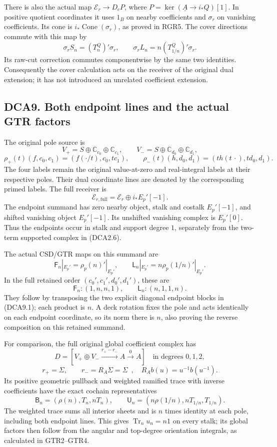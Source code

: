 There is also the actual map \(\mathscr E_r\to D_cP\), where
\(P=\ker(\underline A\to i_*Q)[1]\). In positive quotient coordinates it
uses \(1_B\) on nearby coefficients and \(\sigma_r\) on vanishing
coefficients. Its cone is \(i_*\operatorname{Cone}(\sigma_r)\), as
proved in RGR5. The cover directions commute with this map by \[
\sigma_rS_n=(T_n^Q)'\sigma_r,\qquad
\sigma_rL_n=n(T_{1/n}^Q)'\sigma_r.
\tag{DCA8.4}
\] Its raw-cut correction commutes componentwise by the same two
identities. Consequently the cover calculation acts on the receiver of
the original dual extension; it has not introduced an unrelated
coefficient extension.

\subsection{DCA9. Both endpoint lines and the actual GTR
factors}\label{dca9.-both-endpoint-lines-and-the-actual-gtr-factors}

The original pole source is \[
V_+=S\oplus\mathbb C_{c_0}\oplus\mathbb C_{c_1},\qquad
V_-=S\oplus\mathbb C_{d_0}\oplus\mathbb C_{d_1},
\] \[
\rho_+(t)(f,c_0,c_1)=(f(\cdot/t),c_0,tc_1),\qquad
\rho_-(t)(h,d_0,d_1)=(t h(t\,\cdot),td_0,d_1).
\tag{DCA9.1}
\] The four labels remain the original value-at-zero and real-integral
labels at their respective poles. Their dual coordinate lines are
denoted by the corresponding primed labels. The full receiver is \[
\mathscr E_{r,\mathrm{full}}=\mathscr E_r\oplus i_*E_p'[-1].
\tag{DCA9.2}
\] The endpoint summand has zero nearby object, stalk and costalk
\(E_p'[-1]\), and shifted vanishing object \(E_p'[-1]\). Its unshifted
vanishing complex is \(E_p'[0]\). Thus the endpoints occur in stalk and
support degree \(1\), separately from the two-term supported complex in
(DCA2.6).

The actual CSD/GTR maps on this summand are \[
\mathsf F_n|_{E_p'}=\rho_p(n)'|_{E_p'},\qquad
\mathsf L_n|_{E_p'}=n\rho_p(1/n)'|_{E_p'}.
\tag{DCA9.3}
\] In the full retained order \((c_0',c_1',d_0',d_1')\), these are \[
\boxed{\mathsf F_n:(1,n,n,1),\qquad
\mathsf L_n:(n,1,1,n).}
\tag{DCA9.4}
\] They follow by transposing the two explicit diagonal endpoint blocks
in (DCA9.1); each product is \(n\). A deck rotation fixes the pole and
acts identically on each endpoint coordinate, so its norm there is
\(n\), also proving the reverse composition on this retained summand.

For comparison, the full original global coefficient complex has \[
D=[V_+\oplus V_-\xrightarrow{r_+-r_-}A\xrightarrow0A]
\quad\text{in degrees }0,1,2,
\] \[
r_+=\Sigma,\qquad r_-=R_A\Sigma=\Sigma\widehat{\phantom f},
\quad R_Ab(u)=u^{-1}b(u^{-1}).
\tag{DCA9.5}
\] Its positive geometric pullback and weighted ramified trace with
inverse coefficients have the exact cochain representatives \[
\mathsf B_n=(\rho(n),T_n,nT_n),\qquad
\mathsf U_n=(n\rho(1/n),nT_{1/n},T_{1/n}).
\tag{DCA9.6}
\] The weighted trace sums all interior sheets and is \(n\) times
identity at each pole, including both endpoint lines. This gives
\(\operatorname{Tr}_n u_n=n1\) on every stalk; its global factors then
follow from the angular and top-degree orientation integrals, as
calculated in GTR2--GTR4.

